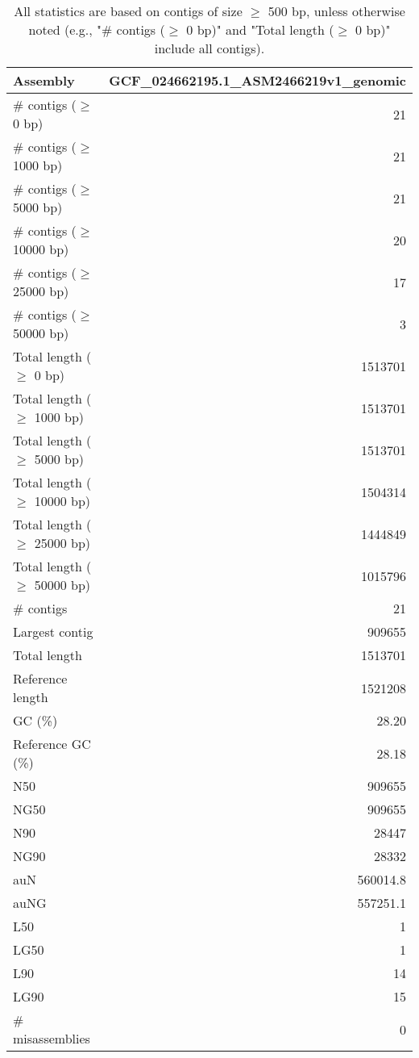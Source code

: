 \documentclass[12pt,a4paper]{article}
\begin{document}
\begin{table}[ht]
\begin{center}
\caption{All statistics are based on contigs of size $\geq$ 500 bp, unless otherwise noted (e.g., "\# contigs ($\geq$ 0 bp)" and "Total length ($\geq$ 0 bp)" include all contigs).}
\begin{tabular}{|l*{1}{|r}|}
\hline
Assembly & GCF\_024662195.1\_ASM2466219v1\_genomic \\ \hline
\# contigs ($\geq$ 0 bp) & 21 \\ \hline
\# contigs ($\geq$ 1000 bp) & 21 \\ \hline
\# contigs ($\geq$ 5000 bp) & 21 \\ \hline
\# contigs ($\geq$ 10000 bp) & 20 \\ \hline
\# contigs ($\geq$ 25000 bp) & 17 \\ \hline
\# contigs ($\geq$ 50000 bp) & 3 \\ \hline
Total length ($\geq$ 0 bp) & 1513701 \\ \hline
Total length ($\geq$ 1000 bp) & 1513701 \\ \hline
Total length ($\geq$ 5000 bp) & 1513701 \\ \hline
Total length ($\geq$ 10000 bp) & 1504314 \\ \hline
Total length ($\geq$ 25000 bp) & 1444849 \\ \hline
Total length ($\geq$ 50000 bp) & 1015796 \\ \hline
\# contigs & 21 \\ \hline
Largest contig & 909655 \\ \hline
Total length & 1513701 \\ \hline
Reference length & 1521208 \\ \hline
GC (\%) & 28.20 \\ \hline
Reference GC (\%) & 28.18 \\ \hline
N50 & 909655 \\ \hline
NG50 & 909655 \\ \hline
N90 & 28447 \\ \hline
NG90 & 28332 \\ \hline
auN & 560014.8 \\ \hline
auNG & 557251.1 \\ \hline
L50 & 1 \\ \hline
LG50 & 1 \\ \hline
L90 & 14 \\ \hline
LG90 & 15 \\ \hline
\# misassemblies & 0 \\ \hline

\end{tabular}
\end{center}
\end{table}
\end{document}
